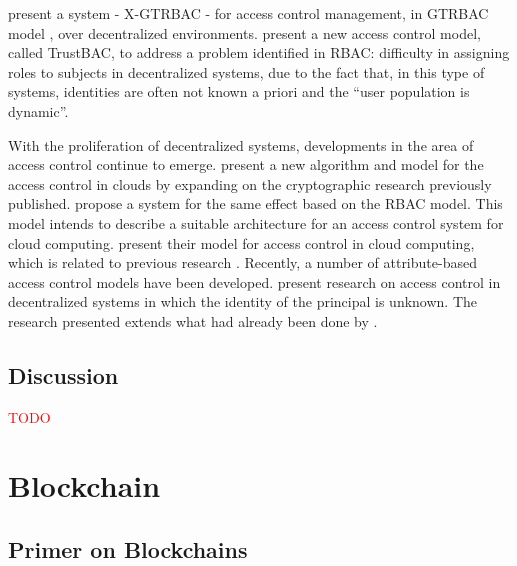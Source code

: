 \citeauthor{bhatti_x-gtrbac_2004} present a system - X-GTRBAC - for access control management, in GTRBAC model \cite{joshi_generalized_2005}, over decentralized environments. \citeauthor{chakraborty_trustbac:_2006} present a new access control model, called TrustBAC, to address a problem identified in RBAC: difficulty in assigning roles to subjects in decentralized systems, due to the fact that, in this type of systems, identities are often not known a priori and the “user population is dynamic”.

With the proliferation of decentralized systems, developments in the area of access control continue
to emerge. \citeauthor{ruj_dacc:_2011} present a new algorithm and model for the access control in clouds by expanding on the cryptographic research previously published. \citeauthor{calero_toward_2010} propose a system for the same effect based on the RBAC model. This model intends to describe a suitable architecture for an access control system for cloud computing. \citeauthor{yu_achieving_2010} present their model for access control in cloud computing, which is related to previous research \cite{calero_toward_2010}. Recently, a number of attribute-based access control models have been developed. \citeauthor{ruj_decentralized_2014} present research on access control in decentralized systems in which the identity of the principal is unknown. The research presented \cite{ruj_decentralized_2014} extends what had already been done by \citeauthor{ruj_privacy_2012}.

\subsection{Discussion}

\textcolor{red}{TODO}

\section{Blockchain}
\label{sec:related-blockchain}

\subsection{Primer on Blockchains}

